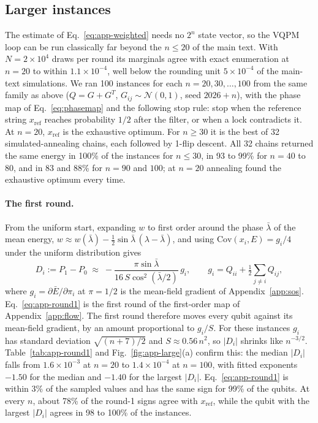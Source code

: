 \subsection{Larger instances}
\label{app:large}
The estimate of Eq.~\eqref{eq:app-weighted} needs no $2^n$ state vector, so the VQPM loop can be run classically far beyond the $n\le20$ of the main text. With $N=2\times10^4$ draws per round its marginals agree with exact enumeration at $n=20$ to within $1.1\times10^{-4}$, well below the rounding unit $5\times10^{-4}$ of the main-text simulations. We ran 100 instances for each $n=20,30,\dots,100$ from the same family as above ($Q=G+G^T$, $G_{ij}\sim\mathcal N(0,1)$, seed $2026+n$), with the phase map of Eq.~\eqref{eq:phasemap} and the following stop rule: stop when the reference string $x_{\mathrm{ref}}$ reaches probability $1/2$ after the filter, or when a lock contradicts it. At $n=20$, $x_{\mathrm{ref}}$ is the exhaustive optimum. For $n\ge30$ it is the best of 32 simulated-annealing chains, each followed by 1-flip descent. All 32 chains returned the same energy in 100\% of the instances for $n\le30$, in 93 to 99\% for $n=40$ to $80$, and in 83 and 88\% for $n=90$ and $100$; at $n=20$ annealing found the exhaustive optimum every time.

\paragraph{The first round.} From the uniform start, expanding $w$ to first order around the phase $\bar\lambda$ of the mean energy, $w\approx w(\bar\lambda)-\tfrac12\sin\bar\lambda\,(\lambda-\bar\lambda)$, and using $\mathrm{Cov}(x_i,E)=g_i/4$ under the uniform distribution gives
\begin{equation}
D_i:=P_1-P_0\;\approx\;-\frac{\pi\sin\bar\lambda}{16\,S\cos^2(\bar\lambda/2)}\,g_i,\qquad g_i=Q_{ii}+\tfrac12\sum_{j\ne i}Q_{ij},
\label{eq:app-round1}
\end{equation}
where $g_i=\partial\bar E/\partial\pi_i$ at $\pi=1/2$ is the mean-field gradient of Appendix~\ref{app:sos}. Eq.~\eqref{eq:app-round1} is the first round of the first-order map of Appendix~\ref{app:flow}. The first round therefore moves every qubit against its mean-field gradient, by an amount proportional to $g_i/S$. For these instances $g_i$ has standard deviation $\sqrt{(n+7)/2}$ and $S\approx0.56\,n^2$, so $|D_i|$ shrinks like $n^{-3/2}$. Table~\ref{tab:app-round1} and Fig.~\ref{fig:app-large}(a) confirm this: the median $|D_i|$ falls from $1.6\times10^{-3}$ at $n=20$ to $1.4\times10^{-4}$ at $n=100$, with fitted exponents $-1.50$ for the median and $-1.40$ for the largest $|D_i|$. Eq.~\eqref{eq:app-round1} is within 3\% of the sampled values and has the same sign for 99\% of the qubits. At every $n$, about 78\% of the round-1 signs agree with $x_{\mathrm{ref}}$, while the qubit with the largest $|D_i|$ agrees in 98 to 100\% of the instances.

